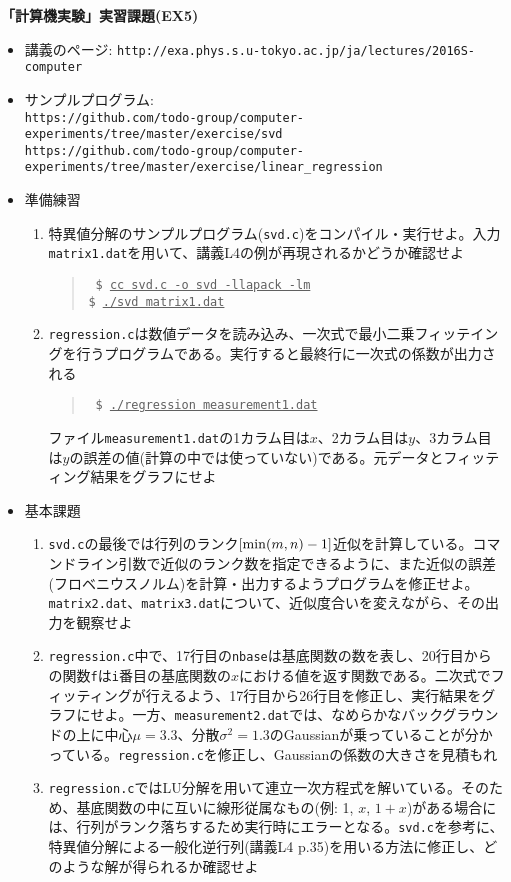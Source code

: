 \documentclass[11pt]{jarticle}
\begin{document}
\noindent
{\bf\large 「計算機実験」実習課題(EX5)}
\\[-0.5em]

\noindent
\begin{itemize}
\item 講義のページ: \verb+http://exa.phys.s.u-tokyo.ac.jp/ja/lectures/2016S-computer+

\item サンプルプログラム: \\ {\small \verb+https://github.com/todo-group/computer-experiments/tree/master/exercise/svd+}
   \\ {\small \verb+https://github.com/todo-group/computer-experiments/tree/master/exercise/linear_regression+}
  
\item 準備練習
  \begin{enumerate}
  \item 特異値分解のサンプルプログラム({\tt svd.c})をコンパイル・実行せよ。入力{\tt matrix1.dat}を用いて、講義L4の例が再現されるかどうか確認せよ
    \begin{quote} \tt
      \$ \underline{cc svd.c -o svd -llapack -lm} \\
      \$ \underline{./svd matrix1.dat}
    \end{quote}
  \item {\tt regression.c}は数値データを読み込み、一次式で最小二乗フィッテイングを行うプログラムである。実行すると最終行に一次式の係数が出力される
    \begin{quote} \tt
      \$ \underline{./regression measurement1.dat}
    \end{quote}
    ファイル{\tt measurement1.dat}の1カラム目は$x$、2カラム目は$y$、3カラム目は$y$の誤差の値(計算の中では使っていない)である。元データとフィッティング結果をグラフにせよ
  \end{enumerate}

\item 基本課題
  \begin{enumerate}
  \item {\tt svd.c}の最後では行列のランク$[{\rm min}(m,n)-1]$近似を計算している。コマンドライン引数で近似のランク数を指定できるように、また近似の誤差(フロベニウスノルム)を計算・出力するようプログラムを修正せよ。{\tt matrix2.dat}、{\tt matrix3.dat}について、近似度合いを変えながら、その出力を観察せよ
  \item {\tt regression.c}中で、17行目の{\tt nbase}は基底関数の数を表し、20行目からの関数{\tt f}は{\tt i}番目の基底関数の$x$における値を返す関数である。二次式でフィッティングが行えるよう、17行目から26行目を修正し、実行結果をグラフにせよ。一方、{\tt measurement2.dat}では、なめらかなバックグラウンドの上に中心$\mu=3.3$、分散$\sigma^2=1.3$のGaussianが乗っていることが分かっている。{\tt regression.c}を修正し、Gaussianの係数の大きさを見積もれ
  \item {\tt regression.c}ではLU分解を用いて連立一次方程式を解いている。そのため、基底関数の中に互いに線形従属なもの(例: 1, $x$, $1+x$)がある場合には、行列がランク落ちするため実行時にエラーとなる。{\tt svd.c}を参考に、特異値分解による一般化逆行列(講義L4 p.35)を用いる方法に修正し、どのような解が得られるか確認せよ
  \end{enumerate}


\end{itemize}
\end{document}
